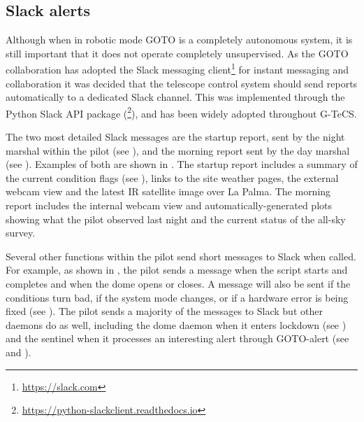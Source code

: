 \subsection{Slack alerts}
\label{sec:slack}
\begin{colsection}

Although when in robotic mode GOTO is a completely autonomous system, it is still important that it does not operate completely unsupervised. As the GOTO collaboration has adopted the Slack messaging client\footnote{\url{https://slack.com}} for instant messaging and collaboration it was decided that the telescope control system should send reports automatically to a dedicated Slack channel. This was implemented through the Python Slack API package (\footnote{\url{https://python-slackclient.readthedocs.io}}), and has been widely adopted throughout G-TeCS.\@

The two most detailed Slack messages are the startup report, sent by the night marshal within the pilot (see ), and the morning report sent by the day marshal (see ). Examples of both are shown in . The startup report includes a summary of the current condition flags (see ), links to the site weather pages, the external webcam view and the latest IR satellite image over La Palma. The morning report includes the internal webcam view and automatically-generated plots showing what the pilot observed last night and the current status of the all-sky survey.

Several other functions within the pilot send short messages to Slack when called. For example, as shown in , the pilot sends a message when the script starts and completes and when the dome opens or closes. A message will also be sent if the conditions turn bad, if the system mode changes, or if a hardware error is being fixed (see ). The pilot sends a majority of the messages to Slack but other daemons do as well, including the dome daemon when it enters lockdown (see ) and the sentinel when it processes an interesting alert through GOTO-alert (see  and ).


\end{colsection}
